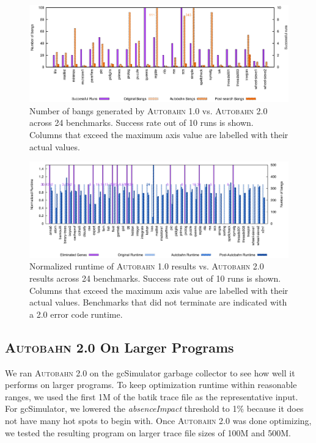\documentclass[format=sigplan, review=true]{acmart}
\newcommand{\hotspots}[0]{hot spots}
\newcommand{\Ao}[0]{\textsc{Autobahn 1.0}}
\newcommand{\At}[0]{\textsc{Autobahn 2.0}}
\newcommand{\absim}[0]{\textit{absenceImpact}}
\begin{document}
\begin{figure}
\includegraphics[width=\textwidth]{pap2-bangs}
\caption{Number of bangs generated by \Ao{} vs. \At{} across 24 benchmarks. Success rate out of 10 runs is shown. Columns that exceed the maximum axis value are labelled with their actual values.}
\end{figure}

\begin{figure}
\includegraphics[width=\textwidth]{pap2}
\caption{Normalized runtime of \Ao{} results vs. \At{} results across 24 benchmarks. Success rate out of 10 runs is shown. Columns that exceed the maximum axis value are labelled with their actual values. Benchmarks that did not terminate are indicated with a 2.0 error code runtime.}
\end{figure}

\subsection{\At{} On Larger Programs}

We ran \At{} on the gcSimulator garbage collector to see how well it performs on larger programs. To keep optimization runtime within reasonable ranges, we used the first 1M of the batik trace file as the representative input. For gcSimulator, we lowered the \absim{} threshold to 1\% because it does not have many \hotspots{} to begin with. Once \At{} was done optimizing, we tested the resulting program on larger trace file sizes of 100M and 500M. 
\end{document}
